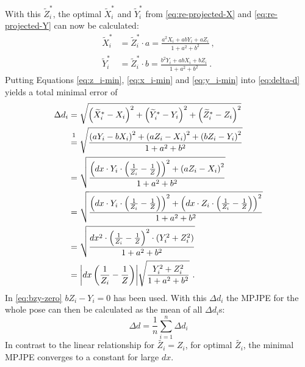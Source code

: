 With this $\widetilde{Z}_i^\ast$, the optimal $\widetilde{X}_i^\ast$ and $\widetilde{Y}_i^\ast$ from \autoref{eq:re-projected-X} and \autoref{eq:re-projected-Y} can now be calculated:
\begin{align}
	\label{eq:x_i-min}
	\widetilde{X}_i^\ast &= \widetilde{Z}_i^\ast \cdot a
	= \frac{a^2 X_i + a b Y_i +  a Z_i}{1 + a^2 + b^2} \ ,\\
	\label{eq:y_i-min}
	\widetilde{Y}_i^\ast &= \widetilde{Z}_i^\ast \cdot b
	= \frac{b^2 Y_i + a b X_i + b Z_i}{1 + a^2 + b^2} \ . 
\end{align}
Putting Equations \eqref{eq:z_i-min}, \eqref{eq:x_i-min} and \eqref{eq:y_i-min} into \autoref{eq:delta-d} yields a total minimal error of 
\begin{align}
	\Delta d_i &= 
	\sqrt{\left (\widetilde{X}_i^\ast - X_i \right )^2 + \left (\widetilde{Y}_i^\ast - Y_i \right )^2 + \left (\widetilde{Z}_i^\ast - Z_i \right )^2}\\
	& \stackrel{\footnotemark}{=} \sqrt{\frac{\left (a Y_i - b X_i \right )^2 + \left (a Z_i - X_i \right )^2 + \left (b Z_i - Y_i \right )^2}{1 + a^2 + b^2}} \\
	\label{eq:bzy-zero}
	&= \sqrt{\frac{\left (dx \cdot Y_i \cdot \left (\frac{1}{Z_i} - \frac{1}{Z} \right) \right)^2 + \left (a Z_i - X_i \right )^2}{1 + a^2 + b^2}}\\
	& = \sqrt{\frac{\left (dx \cdot Y_i \cdot \left (\frac{1}{Z_i} - \frac{1}{Z} \right ) \right)^2 + \left (dx \cdot Z_i \cdot \left (\frac{1}{Z_i} - \frac{1}{Z} \right ) \right)^2}{1 + a^2 + b^2}} \\
	& = \sqrt{\frac{dx^2 \cdot \left (\frac{1}{Z_i} - \frac{1}{Z} \right )^2 \cdot \left (Y_i^2 + Z_i^2 \right ) }{1 + a^2 + b^2}}\\
	\label{eq:minimum-delta-d}
	& = \abs{dx \left (\frac{1}{Z_i} - \frac{1}{Z} \right )} \sqrt{\frac{Y_i^2 + Z_i^2}{1 + a^2 + b^2}} \ .
\end{align}
In \autoref{eq:bzy-zero} $b Z_i - Y_i = 0$ has been used.
With this $\Delta d_i$ the MPJPE for the whole pose can then be calculated as the mean of all $\Delta d_i$s:
\begin{equation}
	\label{eq:minimum-mpjpe-on-shift}
	\Delta d = \frac{1}{n} \sum_{i = 1}^{n} \Delta d_i 
\end{equation}
In contrast to the linear relationship for $\widetilde{Z_i} = Z_i$, for optimal $\widetilde{Z_i}$, the minimal MPJPE converges to a constant for large $dx$.

